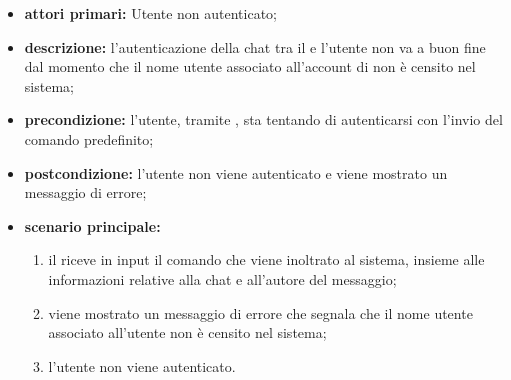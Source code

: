 	\begin{itemize}
		\item \textbf{attori primari:} Utente non autenticato;
		\item \textbf{descrizione:} l'autenticazione della chat tra il  e l'utente non va a buon fine dal momento che il nome utente associato all'account di  non è censito nel sistema;
		\item \textbf{precondizione:} l'utente, tramite , sta tentando di autenticarsi con l'invio del comando predefinito;
		\item \textbf{postcondizione:} l'utente non viene autenticato e viene mostrato un messaggio di errore;
		\item \textbf{scenario principale:}
		\begin{enumerate}
			\item il   riceve in input il comando che viene inoltrato al sistema, insieme alle informazioni relative alla chat e all'autore del messaggio;
			\item viene mostrato un messaggio di errore che segnala che il nome utente associato all'utente  non è censito nel sistema;
			\item l'utente non viene autenticato.
		\end{enumerate}
	\end{itemize}